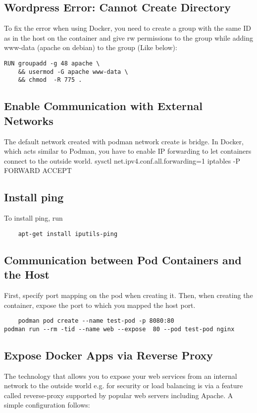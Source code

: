 \documentclass{article}
\begin{document}
\subsection{Wordpress Error: Cannot Create Directory}

To fix the error when using Docker, you need to create a group with the same ID as in the host on the container and give rw permissions to the group while adding www-data (apache on debian) to the group (Like below):  

\begin{verbatim}
RUN groupadd -g 48 apache \
    && usermod -G apache www-data \
    && chmod  -R 775 .
\end{verbatim}



\subsection{Enable Communication with External Networks}
The default network created with podman network create is bridge. In Docker, which acts similar to Podman, you have to enable IP forwarding to let containers connect to the outside world. 
sysctl net.ipv4.conf.all.forwarding=1
iptables -P FORWARD ACCEPT

\subsection{Install ping}
To install ping, run
\begin{verbatim}
	apt-get install iputils-ping
\end{verbatim}


\subsection{Communication between Pod Containers and the Host}
First, specify port mapping on the pod when creating it. Then, when creating the container, expose the port to which you mapped the host port. 
\begin{verbatim}
	podman pod create --name test-pod -p 8080:80 
podman run --rm -tid --name web --expose  80 --pod test-pod nginx

\end{verbatim}

\subsection{Expose Docker Apps via Reverse Proxy}
The technology that allows you to expose your web services from an internal network to the outside world e.g. for security or load balancing is via a feature called reverse-proxy supported by popular web servers including Apache. A simple configuration follows:  
\end{document}
